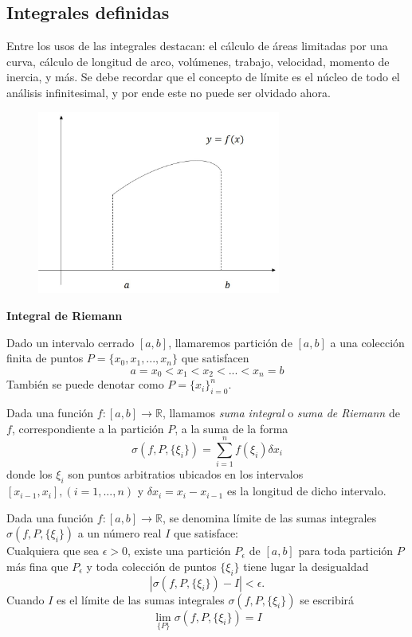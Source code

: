 \documentclass[10pt,twoside]{SelfArx} %
\begin{document}
 \subsection{Integrales definidas}
 Entre los usos de las integrales destacan: el cálculo de áreas limitadas por una curva, cálculo de longitud de arco, volúmenes, trabajo, velocidad, momento de inercia, y más. Se debe recordar que el concepto de límite es el núcleo de todo el análisis infinitesimal, y por ende este no puede ser olvidado ahora.
 \\
 \begin{figure}[h]
 	\centering
 	\includegraphics[width=8cm]{integracion1}
 	\caption{}
 	\label{integracion1}
 	
 \end{figure}
 \textbf{Integral de Riemann}\\
\begin{thm}
	Dado un intervalo cerrado $ [a,b] $, llamaremos partición de $ [a,b] $ a una colección finita de puntos $ P=\{x_{0}, x_{1},..., x_{n}\} $ que satisfacen 
	\[ a=x_{0}<x_{1}<x_{2}<...<x_{n}=b \]
	También se puede denotar como $ P=\{x_{i}\}_{i=0}^{n} $.
\end{thm}
\begin{thm}
	Dada una función $ f:[a,b]\rightarrow\mathbb{R} $, llamamos \textsl{suma integral} o \textsl{suma de Riemann} de $ f $, correspondiente a la partición $ P $, a la suma de la forma
	\[ \sigma(f,P,\{\xi_{i}\})=\sum_{i=1}^{n}f(\xi_{i})\delta x_{i} \]
	donde los $ \xi_{i} $ son puntos arbitratios ubicados en los intervalos $ [x_{i-1}, x_{i}], (i=1,...,n) $ y $ \delta x_{i}=x_{i}-x_{i-1} $ es la longitud de dicho intervalo.
\end{thm}
\begin{thm}
	Dada una función $ f:[a,b]\rightarrow\mathbb{R} $, se denomina límite de las sumas integrales $ \sigma(f,P,\{\xi_{i}\}) $ a un número real $ I $ que satisface:\\
	Cualquiera que sea $ \epsilon>0 $, existe una partición $ P_{\epsilon} $ de $ [a,b] $ para toda partición $ P $ más fina que $ P_{\epsilon} $ y toda colección de puntos $ \{\xi_{i}\} $ tiene lugar la desigualdad  
	\[ 	|\sigma(f,P,\{\xi_{i}\})-I|<\epsilon. \]
	Cuando $ I $ es el límite de las sumas integrales $ \sigma(f,P,\{\xi_{i}\}) $ se escribirá
	\[ \lim\limits_{\{P\}}\sigma(f,P,\{\xi_{i}\})=I \]
\end{thm}
\end{document}
